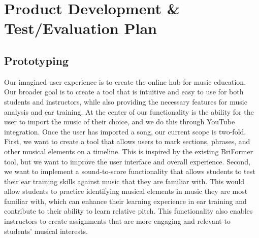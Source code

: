 \documentclass[12pt, letterpaper]{article}
\begin{document}
\section*{Product Development \& Test/Evaluation Plan}

\subsection*{Prototyping}

Our imagined user experience is to create the online hub for music education.  Our broader goal is to create a tool that is intuitive and easy to use for both students and instructors, while also providing the necessary features for music analysis and ear training.  At the center of our functionality is the ability for the user to import the music of their choice, and we do this through YouTube integration.  Once the user has imported a song, our current scope is two-fold.  First, we want to create a tool that allows users to mark sections, phrases, and other musical elements on a timeline.  This is inspired by the existing BriFormer tool, but we want to improve the user interface and overall experience.  Second, we want to implement a sound-to-score functionality that allows students to test their ear training skills against music that they are familiar with.  This would allow students to practice identifying musical elements in music they are most familiar with, which can enhance their learning experience in ear training and contribute to their ability to learn relative pitch.  This functionality also enables instructors to create assignments that are more engaging and relevant to students' musical interests.
\end{document}
